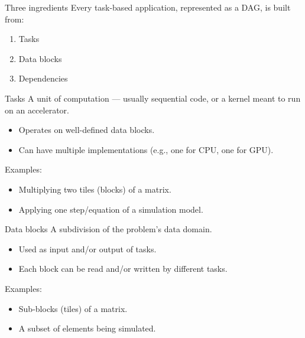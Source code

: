 \documentclass[presentation, aspectratio=169]{beamer}
\begin{document}
\begin{frame}[label={sec:org9e84d6e}]{Three ingredients}
Every task-based application, represented as a DAG, is built from:
\begin{enumerate}
\item \alert{Tasks}
\item \alert{Data blocks}
\item \alert{Dependencies}
\end{enumerate}
\end{frame}
\begin{frame}[label={sec:org0d84228}]{Tasks}
A \alert{unit of computation} — usually sequential code, or a kernel meant to
run on an accelerator.
\begin{itemize}
\item Operates on well-defined data blocks.
\item Can have \alert{multiple implementations} (e.g., one for CPU, one for GPU).
\end{itemize}

Examples:
\begin{itemize}
\item Multiplying two tiles (blocks) of a matrix.
\item Applying one step/equation of a simulation model.
\end{itemize}
\end{frame}
\begin{frame}[label={sec:org4d7b40a}]{Data blocks}
A \alert{subdivision of the problem's data domain}.
\begin{itemize}
\item Used as input and/or output of tasks.
\item Each block can be read and/or written by different tasks.
\end{itemize}

Examples:
\begin{itemize}
\item Sub-blocks (tiles) of a matrix.
\item A subset of elements being simulated.
\end{itemize}
\end{frame}
\end{document}
